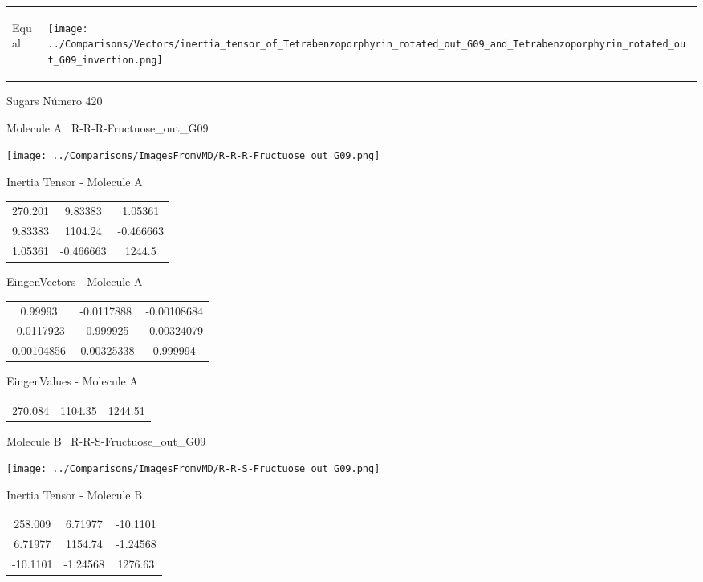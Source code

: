 \vtab[-5mm]
\begin{tabular}{*{2}{m{}}}
\begin{center}
\textcolor{NavyBlue}{\Large Equal}
\end{center}
&
\begin{center}
\texttt{[image: ../Comparisons/Vectors/inertia\_tensor\_of\_Tetrabenzoporphyrin\_rotated\_out\_G09\_and\_Tetrabenzoporphyrin\_rotated\_out\_G09\_invertion.png]}
\end{center}
\end{tabular}

 \newpage

\vtab[-3cm]
\begin{center}
{\large Sugars \tab Número 420}
\end{center}
\begin{multicols}{2}
\begin{center}

Molecule A \
R-R-R-Fructuose\_out\_G09

\texttt{[image: ../Comparisons/ImagesFromVMD/R-R-R-Fructuose\_out\_G09.png]}

Inertia Tensor - Molecule A \\
\begin{tabular}{|c c c|}
270.201	 & 	9.83383	 & 	1.05361	 \\
9.83383	 & 	1104.24	 & 	-0.466663	 \\
1.05361	 & 	-0.466663	 & 	1244.5
\end{tabular}

\vtab
 EingenVectors - Molecule A     \\
\begin{tabular}{|c c c|}
0.99993	 & 	-0.0117888	 & 	-0.00108684	 \\
-0.0117923	 & 	-0.999925	 & 	-0.00324079	 \\
0.00104856	 & 	-0.00325338	 & 	0.999994
\end{tabular}

\vtab
 EingenValues - Molecule A     \\
\begin{tabular}{|c c c|}
270.084	 & 	1104.35	 & 	1244.51	 \\
\end{tabular}
\columnbreak

Molecule B \
R-R-S-Fructuose\_out\_G09

\texttt{[image: ../Comparisons/ImagesFromVMD/R-R-S-Fructuose\_out\_G09.png]}

Inertia Tensor - Molecule B \\
\begin{tabular}{|c c c|}
258.009	 & 	6.71977	 & 	-10.1101	 \\
6.71977	 & 	1154.74	 & 	-1.24568	 \\
-10.1101	 & 	-1.24568	 & 	1276.63
\end{tabular}


\end{center}
\end{multicols}
